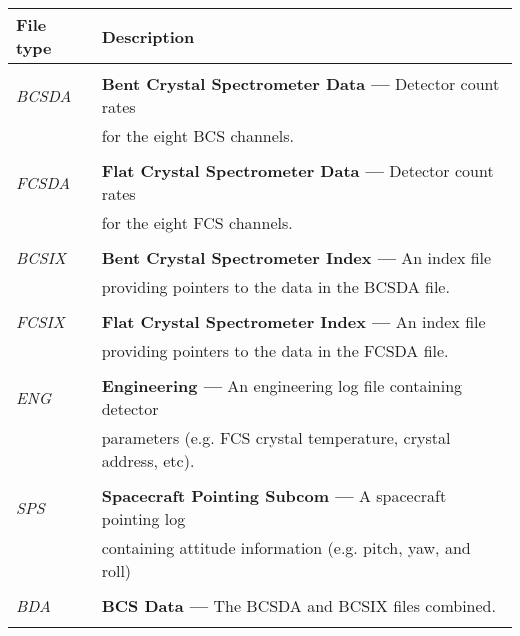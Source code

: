 \begin{center}
\begin{tabular}{||l l||}
\hline
       {\bf File type} & {\bf Description}\\
\hline
                   &            \\

 {\em BCSDA} & {\bf Bent Crystal Spectrometer Data ---} Detector count rates \\
                    & for the eight BCS channels. \\
                    &            \\

 {\em FCSDA} & {\bf Flat Crystal Spectrometer Data ---} Detector count rates \\
                    & for the eight FCS channels. \\
                    &            \\

 {\em BCSIX} & {\bf Bent Crystal Spectrometer Index  ---} An index file \\
                   & providing pointers to the data in the BCSDA file.\\
                   &                                \\

 {\em FCSIX} & {\bf Flat Crystal Spectrometer Index ---} An index file  \\
                    & providing pointers to the data in the FCSDA file.\\
                    &  \\

 {\em ENG} & {\bf Engineering ---} An engineering log file containing detector \\
     &   parameters (e.g. FCS crystal temperature, crystal address, etc). \\
     &  \\

 {\em SPS} & {\bf Spacecraft Pointing Subcom ---} A spacecraft pointing
log \\
                  & containing attitude information (e.g. pitch, yaw, and roll) \\
                    &                               \\

 {\em BDA} & {\bf BCS Data ---} The BCSDA and BCSIX files combined. \\
                   & \\


\end{tabular}
\end{center}
